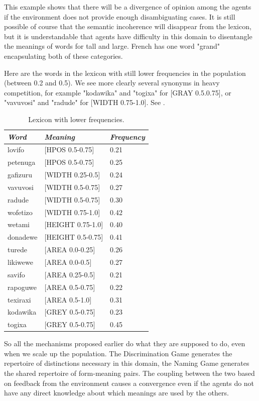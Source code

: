 This example shows that there will be a divergence of 
opinion among the agents if the environment does not 
provide enough 
disambiguating cases. It is still possible of course that 
the semantic incoherence will disappear from the lexicon, 
but it is understandable that agents have difficulty 
in this domain to disentangle the meanings of words for 
tall and large. French has one word "grand" encapsulating
both of these categories.

Here are the words in the lexicon with still lower 
frequencies in the population (between 0.2 and 0.5). We see
more clearly several synonyms in heavy competition, for example 
"kodawika" and "togixa" for [GRAY 0.5.0.75], or 
"vavuvosi" and "radude" for [WIDTH 0.75-1.0]. See . 
\begin{table}
\begin{center}
\begin{tabular}{ l  l  l } \midrule
{\it Word}&{\it Meaning} & {\it Frequency} \\ \midrule
lovifo & [HPOS 0.5-0.75] & 0.21 \\ \midrule
petenuga & [HPOS 0.5-0.75] & 0.25 \\ \midrule
gafizuru & [WIDTH 0.25-0.5] & 0.24 \\ \midrule
vavuvosi & [WIDTH 0.5-0.75] & 0.27 \\ \midrule
radude & [WIDTH 0.5-0.75] & 0.30 \\ \midrule
wofetizo & [WIDTH 0.75-1.0] & 0.42 \\ \midrule
wetami & [HEIGHT 0.75-1.0] & 0.40 \\ \midrule
donadewe & [HEIGHT 0.5-0.75] & 0.41 \\ \midrule
turede & [AREA 0.0-0.25] & 0.26 \\ \midrule
likiwewe & [AREA 0.0-0.5] & 0.27 \\ \midrule
savifo & [AREA 0.25-0.5] & 0.21 \\ \midrule
rapoguwe & [AREA 0.5-0.75] & 0.22 \\ \midrule
texiraxi & [AREA 0.5-1.0] & 0.31 \\ \midrule
kodawika & [GREY 0.5-0.75] & 0.23 \\ \midrule
togixa & [GREY 0.5-0.75] & 0.45 \\ \midrule
\end{tabular}
\caption{\label{tab:comp} Lexicon with lower frequencies.}
\end{center}
\end{table}

So all the mechanisms proposed earlier 
do what they are supposed to do, even when we 
scale up the population. The Discrimination 
Game generates the repertoire of distinctions 
necessary in this domain, the Naming Game generates
the shared repertoire of form-meaning pairs. The 
coupling between the two based on feedback from 
the environment causes a convergence even if the
agents do not have any direct knowledge about 
which meanings are used by the others. 

